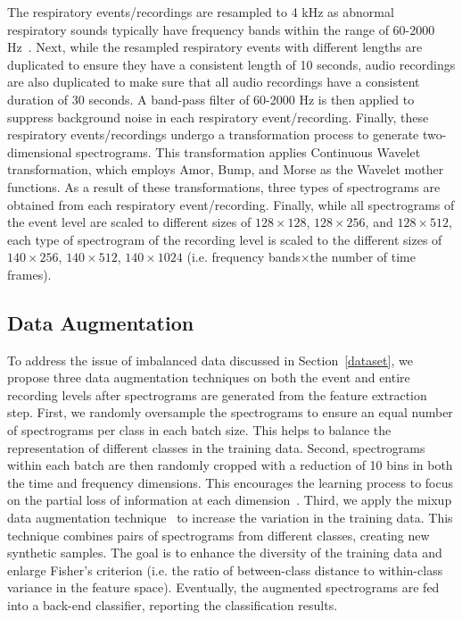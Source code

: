 \documentclass[conference]{IEEEtran}
\begin{document}
The respiratory events/recordings are resampled to 4 kHz as abnormal respiratory sounds typically have frequency bands within the range of 60-2000 Hz~\cite{zhang2022sprsound}. Next, while the resampled respiratory events with different lengths are duplicated to ensure they have a consistent length of 10 seconds, audio recordings are also duplicated to make sure that all audio recordings have a consistent duration of 30 seconds. A band-pass filter of 60-2000 Hz is then applied to suppress background noise in each respiratory event/recording. Finally, these respiratory events/recordings undergo a transformation process to generate two-dimensional spectrograms. This transformation applies Continuous Wavelet transformation, which employs Amor, Bump, and Morse as the Wavelet mother functions. As a result of these transformations, three types of spectrograms are obtained from each respiratory event/recording. Finally, while all spectrograms of the event level are scaled to different sizes of $128{\times}128$, $128{\times}256$, and $128{\times}512$, each type of spectrogram of the recording level is scaled to the different sizes of $140{\times}256$, $140{\times}512$, $140{\times}1024$ (i.e. frequency bands${\times}$the number of time frames).

\subsection{Data Augmentation}

To address the issue of imbalanced data discussed in Section~\ref{dataset}, we propose three data augmentation techniques on both the event and entire recording levels after spectrograms are generated from the feature extraction step. First, we randomly oversample the spectrograms to ensure an equal number of spectrograms per class in each batch size. This helps to balance the representation of different classes in the training data. Second, spectrograms within each batch are then randomly cropped with a reduction of 10 bins in both the time and frequency dimensions. This encourages the learning process to focus on the partial loss of information at each dimension~\cite{park2019specaugment}. Third, we apply the mixup data augmentation technique~\cite{tokozume2017learning} to increase the variation in the training data. This technique combines pairs of spectrograms from different classes, creating new synthetic samples. The goal is to enhance the diversity of the training data and enlarge Fisher's criterion (i.e. the ratio of between-class distance to within-class variance in the feature space). Eventually, the augmented spectrograms are fed into a back-end classifier, reporting the classification results.
\end{document}
